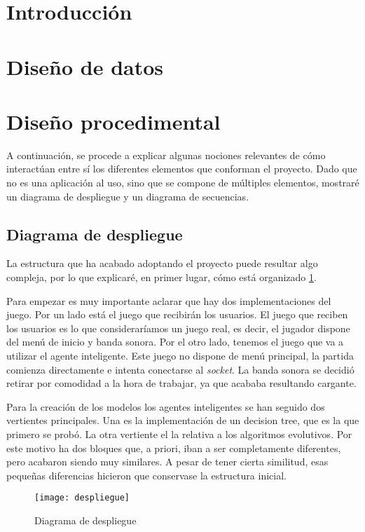 
\section{Introducción}

\section{Diseño de datos}

\section{Diseño procedimental}
A continuación, se procede a explicar algunas nociones relevantes de cómo interactúan entre sí los diferentes elementos que conforman el proyecto. Dado que no es una aplicación al uso, sino que se compone de múltiples elementos, mostraré un diagrama de despliegue y un diagrama de secuencias.

\subsection{Diagrama de despliegue}
La estructura que ha acabado adoptando el proyecto puede resultar algo compleja, por lo que explicaré, en primer lugar, cómo está organizado \ref{fig:d_desp}.

Para empezar es muy importante aclarar que hay dos implementaciones del juego. Por un lado está el juego que recibirán los usuarios. El juego que reciben los usuarios es lo que consideraríamos un juego real, es decir, el jugador dispone del menú de inicio y banda sonora. Por el otro lado, tenemos el juego que va a utilizar el agente inteligente. Este juego no dispone de menú principal, la partida comienza directamente e intenta conectarse al \emph{socket}. La banda sonora se decidió retirar por comodidad a la hora de trabajar, ya que acababa resultando cargante.

Para la creación de los modelos los agentes inteligentes se han seguido dos vertientes principales. Una es la implementación de un decision tree, que es la que primero se probó. La otra vertiente el la relativa a los algoritmos evolutivos. Por este motivo ha dos bloques que, a priori, iban a ser completamente diferentes, pero acabaron siendo muy similares. A pesar de tener cierta similitud, esas pequeñas diferencias hicieron que conservase la estructura inicial.


\begin{figure}
    \centering
    \texttt{[image: despliegue]}
    \caption{Diagrama de despliegue}
    \label{fig:d_desp}
\end{figure}


